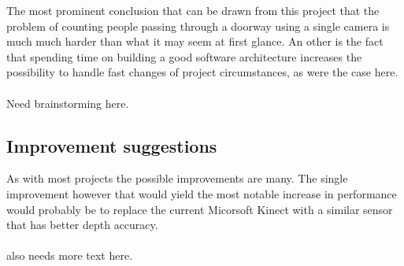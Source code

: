 The most prominent conclusion that can be drawn from this project that the problem of counting people passing through a doorway using a single camera is much much harder than what it may seem at first glance. An other is the fact that spending time on building a good software architecture increases the possibility to handle fast changes of project circumstances, as were the case here.\\
\\
Need brainstorming here.

\subsection{Improvement suggestions}
As with most projects the possible improvements are many. The single improvement however that would yield the most notable increase in performance would probably be to replace the current Micorsoft Kinect with a similar sensor that has better depth accuracy.\\
\\
also needs more text here.















